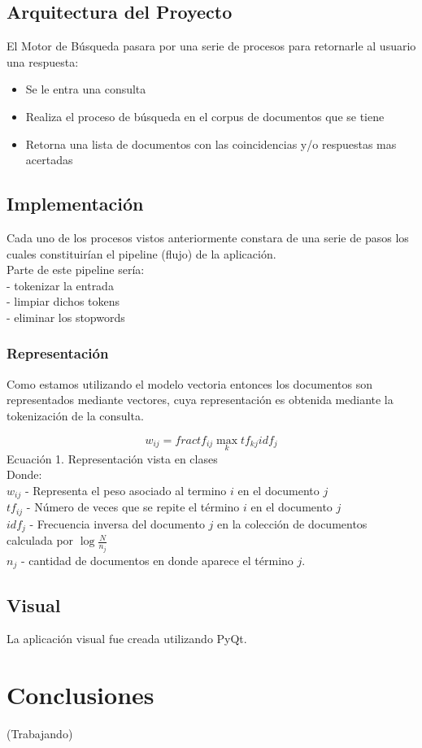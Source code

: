 \documentclass[runningheads]{llncs}
\begin{document}
\subsection*{Arquitectura del Proyecto}
El Motor de Búsqueda pasara por una serie de procesos para retornarle al usuario una respuesta:
\begin{itemize}
	\item Se le entra una consulta
	\item Realiza el proceso de búsqueda en el corpus de documentos que se tiene
	\item Retorna una lista de documentos con las coincidencias y/o respuestas mas acertadas 
\end{itemize}

\subsection*{Implementación}
Cada uno de los procesos vistos anteriormente constara de una serie de pasos los cuales constituirían el pipeline (flujo) de la aplicación.\\

Parte de este pipeline sería: \\
- tokenizar la entrada \\
- limpiar dichos tokens \\
- eliminar los stopwords

\subsubsection*{Representación}
Como estamos utilizando el modelo vectoria entonces los documentos son representados mediante vectores, cuya representación es obtenida mediante la tokenización de la consulta.

\begin{equation}
	w_{ij} = frac{tf_{ij}}{\max_{k} tf_{kj}}idf_{j}
\end{equation}
Ecuación 1. Representación vista en clases\\

Donde:\\
$ w_{ij} $ - Representa el peso asociado al termino $ i $ en el documento $ j $\\
$tf_{ij}$ - Número de veces que se repite el término $i$ en el documento $j$\\
$idf_{j}$ - Frecuencia inversa del documento $j$ en la colección de documentos calculada por $\log{\frac{N}{n_j}}$\\
$n_j$ - cantidad de documentos en donde aparece el término $j$.

\subsection*{Visual}
La aplicación visual fue creada utilizando PyQt.

\section*{Conclusiones}
(Trabajando)
\end{document}
